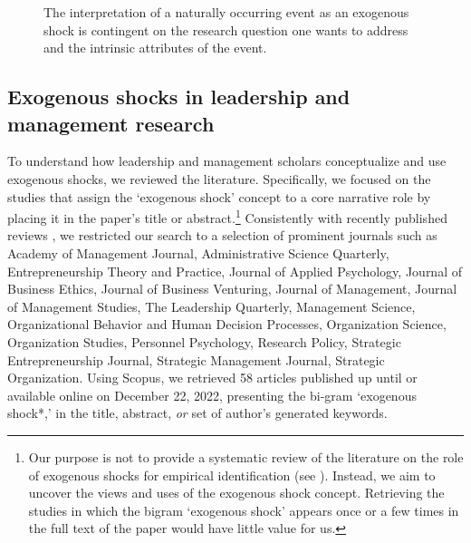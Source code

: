 \documentclass[11pt]{article}
\begin{document}
\begin{refsection}
\begin{figure}
  \caption{The interpretation of a naturally occurring event as an exogenous 
  shock is contingent on the research question one wants to address and the 
  intrinsic attributes of the event.
  }
  \label{fig:ex_shocks_and_ne}
\end{figure}

\subsection{Exogenous shocks in leadership and management research}
\label{subsec:exogenous_shocks_in_management}

\noindent To understand how leadership and management scholars conceptualize and use exogenous shocks, we reviewed the literature.  Specifically, we focused on the studies that assign the `exogenous shock' concept to a core narrative role by placing it in the paper's title or abstract.\footnote{ Our purpose is not to provide a systematic review of the literature on the role of exogenous shocks for empirical identification (see \cite{sieweke_santoni_2020}). Instead, we aim to uncover the views and uses of the exogenous shock concept.  Retrieving the studies in which the bigram `exogenous shock' appears once or a few times in the full text of the paper would have little value for us.} Consistently with recently published reviews  \autocite[e.g.,][]{gonzalez_et_al_2018,rindova_et_al_2018}, we restricted our search to a selection of prominent journals such as Academy of Management Journal, Administrative Science Quarterly, Entrepreneurship Theory and Practice, Journal of Applied Psychology, Journal of Business Ethics, Journal of Business Venturing, Journal of Management, Journal of Management Studies, The Leadership Quarterly, Management Science, Organizational Behavior and Human Decision Processes, Organization Science, Organization Studies, Personnel Psychology, Research Policy, Strategic Entrepreneurship Journal, Strategic Management Journal, Strategic Organization.  Using Scopus, we retrieved 58 articles published up until or available online on December 22, 2022, presenting the bi-gram `exogenous shock*,' in the title, abstract, \emph{or} set of author's generated keywords.


\end{refsection}
\end{document}
